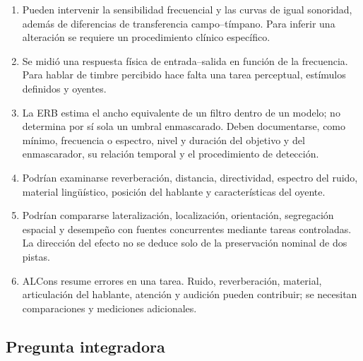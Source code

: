 \begin{enumerate}[label=\textbf{A\arabic*.},leftmargin=*]
    \item Pueden intervenir la sensibilidad frecuencial y las curvas de igual
    sonoridad, además de diferencias de transferencia campo--tímpano. Para
    inferir una alteración se requiere un procedimiento clínico específico.

    \item Se midió una respuesta física de entrada--salida en función de la
    frecuencia. Para hablar de timbre percibido hace falta una tarea
    perceptual, estímulos definidos y oyentes.

    \item La ERB estima el ancho equivalente de un filtro dentro de un modelo;
    no determina por sí sola un umbral enmascarado. Deben documentarse, como
    mínimo, frecuencia o espectro, nivel y duración del objetivo y del
    enmascarador, su relación temporal y el procedimiento de detección.

    \item Podrían examinarse reverberación, distancia, directividad, espectro
    del ruido, material lingüístico, posición del hablante y características
    del oyente.

    \item Podrían compararse lateralización, localización, orientación,
    segregación espacial y desempeño con fuentes concurrentes mediante tareas
    controladas. La dirección del efecto no se deduce solo de la preservación
    nominal de dos pistas.

    \item ALCons resume errores en una tarea. Ruido, reverberación, material,
    articulación del hablante, atención y audición pueden contribuir; se
    necesitan comparaciones y mediciones adicionales.
\end{enumerate}

\subsection*{Pregunta integradora}

